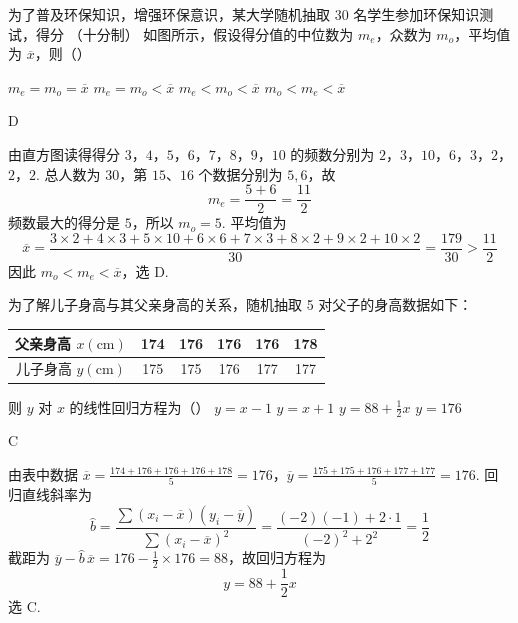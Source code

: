 \begin{problem}
为了普及环保知识，增强环保意识，某大学随机抽取 30 名学生参加环保知识测试，得分 （十分制） 如图所示，假设得分值的中位数为 \(m_{e}\)，众数为 \(m_{o}\)，平均值为 \(\overline{x}\)，则（\quad）


\choices
    {\(m_{e} = m_{o} = \overline{x}\)}
    {\(m_{e} = m_{o} < \overline{x}\)}
    {\(m_{e} < m_{o} < \overline{x}\)}
    {\(m_{o} < m_{e} < \overline{x}\)}
\end{problem}

\begin{answer}
D
\end{answer}

\begin{solution}
由直方图读得得分 \(3\)，\(4\)，\(5\)，\(6\)，\(7\)，\(8\)，\(9\)，\(10\) 的频数分别为
\(2\)，\(3\)，\(10\)，\(6\)，\(3\)，\(2\)，\(2\)，\(2\).
总人数为 \(30\)，第 \(15\)、\(16\) 个数据分别为 \(5,6\)，故
\[
m_e=\frac{5+6}{2}=\frac{11}{2}
\]
频数最大的得分是 \(5\)，所以 \(m_o=5\). 平均值为
\[
\overline{x}=\frac{3\times2+4\times3+5\times10+6\times6+7\times3+8\times2+9\times2+10\times2}{30}
=\frac{179}{30}>\frac{11}{2}
\]
因此 \(m_o<m_e<\overline{x}\)，选 D.
\end{solution}

\begin{problem}
为了解儿子身高与其父亲身高的关系，随机抽取 5 对父子的身高数据如下：
\begin{center}
\renewcommand{\arraystretch}{1.1}
\begin{tabular}{c|ccccc}
父亲身高 \(x(\mathrm{cm})\) & 174 & 176 & 176 & 176 & 178 \\
\hline
儿子身高 \(y(\mathrm{cm})\) & 175 & 175 & 176 & 177 & 177
\end{tabular}
\end{center}
则 \(y\) 对 \(x\) 的线性回归方程为（\quad）
\choices
    {\(y = x - 1\)}
    {\(y = x + 1\)}
    {\(y = 88 + \frac{1}{2} x\)}
    {\(y = 176\)}
\end{problem}

\begin{answer}
C
\end{answer}

\begin{solution}
由表中数据
\(\overline{x}=\frac{174+176+176+176+178}{5}=176\)，\(\overline{y}=\frac{175+175+176+177+177}{5}=176\).
回归直线斜率为
\[
\hat b=\frac{\sum (x_i-\overline{x})(y_i-\overline{y})}{\sum (x_i-\overline{x})^2}
=\frac{(-2)(-1)+2\cdot1}{(-2)^2+2^2}=\frac12
\]
截距为 \(\overline y-\hat b\,\overline x=176-\frac12\times176=88\)，故回归方程为
\[
y=88+\frac12x
\]
选 C.
\end{solution}

